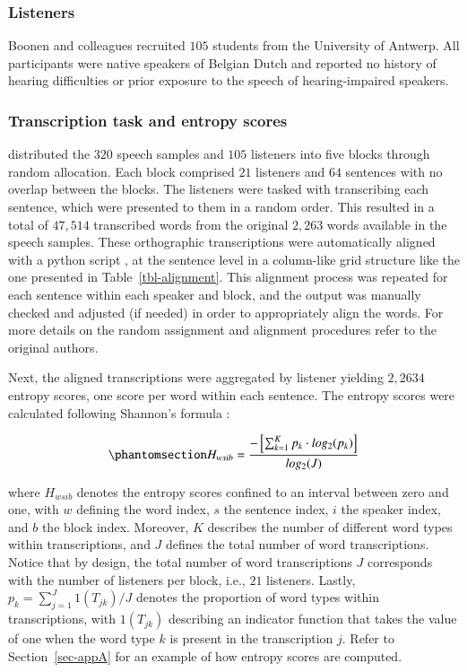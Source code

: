 \documentclass[
  authoryear,
  preprint,
  1p]{elsarticle}
\begin{document}
\subsubsection{Listeners}\label{sec-M-L}

Boonen and colleagues recruited \(105\) students from the University of
Antwerp. All participants were native speakers of Belgian Dutch and
reported no history of hearing difficulties or prior exposure to the
speech of hearing-impaired speakers.

\subsubsection{Transcription task and entropy scores}\label{sec-M-TS}

{\citet{Boonen_et_al_2021} distributed the \(320\) speech samples and
\(105\) listeners into five blocks through random allocation. Each block
comprised \(21\) listeners and \(64\) sentences with no overlap between
the blocks. The listeners were tasked with transcribing each sentence,
which were presented to them in a random order. This resulted in a total
of \(47,514\) transcribed words from the original \(2,263\) words
available in the speech samples. These orthographic transcriptions were
automatically aligned with a python script \citep{Boonen_et_al_2021}, at
the sentence level in a column-like grid structure like the one
presented in Table~\ref{tbl-alignment}.} This alignment process was
repeated for each sentence within each speaker and block, and the output
was manually checked and adjusted (if needed) in order to appropriately
align the words. {For more details on the random assignment and
alignment procedures refer to the original authors.}

{Next, the aligned transcriptions were aggregated by listener yielding
\(2,2634\) entropy scores, one score per word within each sentence.} The
entropy scores were calculated following Shannon's formula
\citeyearpar{Shannon_1948}:

\begin{equation}\phantomsection\label{eq-entropy}{
H_{wsib} = \frac{ -\left[ \sum_{k=1}^{K}  p_{k} \cdot log_{2}(p_{k}) \right] }{ log_{2}(J)}
}\end{equation}

where \(H_{wsib}\) denotes the entropy scores confined to an interval
between zero and one, with \(w\) defining the word index, \(s\) the
sentence index, \(i\) the speaker index, and \(b\) the block index.
Moreover, \(K\) describes the number of different word types within
transcriptions, and \(J\) defines the total number of word
transcriptions. Notice that by design, the total number of word
transcriptions \(J\) corresponds with the number of listeners per block,
i.e., \(21\) listeners. Lastly, \(p_{k} = \sum_{j=1}^{J} 1(T_{jk}) / J\)
denotes the proportion of word types within transcriptions, with
\(1(T_{jk})\) describing an indicator function that takes the value of
one when the word type \(k\) is present in the transcription \(j\).
Refer to Section~\ref{sec-appA} for an example of how entropy scores are
computed.
\end{document}
